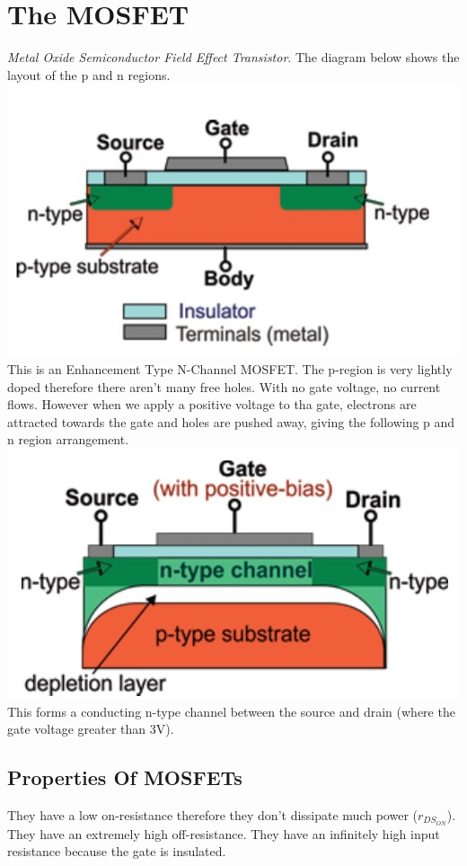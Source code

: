 \documentclass[a4paper,11pt, twocolumn]{article}
\begin{document}
\section{The MOSFET}
\textit{Metal Oxide Semiconductor Field Effect Transistor}. The diagram below shows the layout of the p and n regions.
\includegraphics[width=\linewidth]{mosfet1.jpg}
This is an Enhancement Type N-Channel MOSFET. The p-region is very lightly doped therefore there aren't many free holes. With no gate voltage, no current flows. However when we apply a positive voltage to tha gate, electrons are attracted towards the gate and holes are pushed away, giving the following p and n region arrangement.
\includegraphics[width=\linewidth]{mosfet2.jpg}
This forms a conducting n-type channel between the source and drain (where the gate voltage greater than 3V).
\subsection{Properties Of MOSFETs}
They have a low on-resistance therefore they don't dissipate much power ($r_{DS_{ON}}$). They have an extremely high off-resistance. They have an infinitely high input resistance because the gate is insulated.
\end{document}
